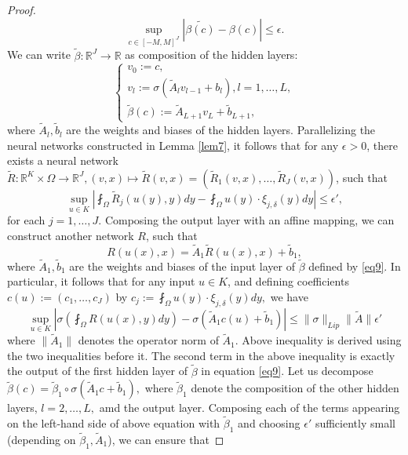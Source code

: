 \documentclass[reqno,9pt]{amsart}
\theoremstyle{plain}
\theoremstyle{definition}
\newcommand{\bb}[1]{\mathbb{#1}}
\begin{document}
\begin{proof}
\begin{equation}
        \sup_{c \in [-M,M]^J}|\tilde{\beta(c)} - \beta(c)| \leq \epsilon.
    \end{equation}
    We can write $\tilde{\beta}:\bb R^J \to \bb R$ as composition of the hidden layers:
    \begin{equation}
    \begin{cases} \label{eq9}
        v_0 := c,\\
        v_l := \sigma\left(\tilde{A}_lv_{l-1} + b_l\right), l = 1, \dots, L,\\
        \tilde{\beta}(c) := \tilde{A}_{L+1}v_L + \tilde{b}_{L+1},
    \end{cases}
    \end{equation}
    where $\tilde{A}_l, \tilde{b}_l$ are the weights and biases of the hidden layers. Parallelizing the neural networks constructed in Lemma \ref{lem7}, it follows that for any $\epsilon > 0$, there exists a neural network $\tilde{R}: \bb R^K \times \Omega \to \bb R^J, (v,x) \mapsto \tilde{R}(v,x) = (\tilde{R}_1(v,x), \dots, \tilde{R}_J(v,x))$, such that
    $$ \sup_{u \in K}\left|\fint_\Omega \tilde{R}_j(u(y),y) dy - \fint_\Omega u(y)\cdot \xi_{j,\delta}(y) dy\right| \leq \epsilon',$$
    for each $j = 1,\dots, J$. Composing the output layer with an affine mapping, we can construct another network $R$, such that
    $$ R(u(x),x) = \tilde{A}_1\tilde{R}(u(x),x) + \tilde{b}_1,$$
    where $\tilde{A}_1,\tilde{b}_1$ are the weights and biases of the input layer of $\tilde{\beta}$ defined by \ref{eq9}. In particular, it follows that for any input $u \in K$, and defining coefficients $c(u) := (c_1, \dots, c_J)$ by $c_j := \fint_\Omega u(y) \cdot \xi_{j,\delta}(y) dy,$ we have 
    \begin{equation}\label{eq10}
        \sup_{u \in K}\left|\sigma\left(\fint_\Omega R(u(x),y) dy\right) - \sigma\left(\tilde{A}_1 c(u)+\tilde{b}_1\right)\right| \leq \|\sigma\|_{Lip}\|\tilde{A}\|\epsilon'
\end{equation}
    where $\|\tilde{A}_1\|$ denotes the operator norm of $\tilde{A}_1$. Above inequality is derived using the two inequalities before it. The second term in the above inequality is exactly the output of the first hidden layer of $\tilde{\beta}$ in equation \ref{eq9}. Let us decompose $\tilde{\beta}(c) = \tilde{\beta}_1 \circ \sigma(\tilde{A}_1 c + \tilde{b}_1),$ where $\tilde{\beta}_1$ denote the composition of the other hidden layers, $l = 2, \dots, L,$ amd the output layer. Composing each of the terms appearing on the left-hand side of above equation with $\tilde{\beta}_1$ and choosing $\epsilon'$ sufficiently small (depending on $\tilde{\beta}_1,\tilde{A}_1$), we can ensure that

\end{proof}
\end{document}
